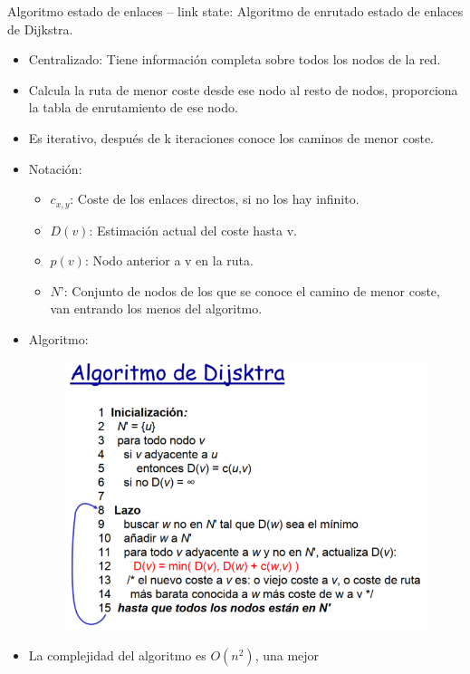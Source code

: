 \documentclass[12pt, twoside, openright]{report} %
\begin{document}
Algoritmo estado de enlaces -- link state: Algoritmo de enrutado
estado de enlaces de Dijkstra.

\begin{itemize}
	\item Centralizado: Tiene información completa sobre todos los nodos de
	      la red.
	\item Calcula la ruta de menor coste desde ese nodo al resto de nodos,
	      proporciona la tabla de enrutamiento de ese nodo.
	\item Es iterativo, después de k iteraciones conoce los caminos de menor
	      coste.
	\item Notación:

	      \begin{itemize}
		      \item \(c_{x,y}\): Coste de los enlaces directos, si no los hay
		            infinito.
		      \item \(D(v)\): Estimación actual del coste hasta v.
		      \item \(p(v)\): Nodo anterior a v en la ruta.
		      \item \(N’\): Conjunto de nodos de los que se conoce el camino de
		            menor coste, van entrando los menos del algoritmo.
	      \end{itemize}
	      \pagebreak
	\item Algoritmo:
	      \begin{figure}[H]
		      {\includegraphics[scale=.4]{Untitled 39.png}}
	      \end{figure}
	\item La complejidad del algoritmo es \(O(n^2)\), una mejor

\end{itemize}
\end{document}
